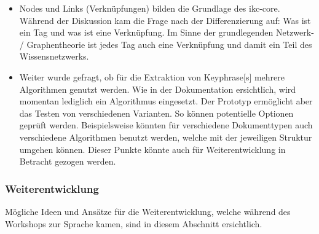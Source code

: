 \begin{itemize}
    \item Nodes und Links (Verknüpfungen) bilden die Grundlage des \gls{ikc-core}. Während der Diskussion kam die Frage nach der Differenzierung auf: Was ist ein Tag und was ist eine Verknüpfung. Im Sinne der grundlegenden Netzwerk- / Graphentheorie ist jedes Tag auch eine Verknüpfung und damit ein Teil des Wissensnetzwerks.
    \item Weiter wurde gefragt, ob für die Extraktion von \gls{Keyphrase}[s] mehrere Algorithmen genutzt werden. Wie in der Dokumentation ersichtlich, wird momentan lediglich ein Algorithmus eingesetzt. Der Prototyp ermöglicht aber das Testen von verschiedenen Varianten. So können potentielle Optionen geprüft werden. Beispielsweise könnten für verschiedene Dokumenttypen auch verschiedene Algorithmen benutzt werden, welche mit der jeweiligen Struktur umgehen können. Dieser Punkte könnte auch für Weiterentwicklung in Betracht gezogen werden.
\end{itemize}

\subsubsection{Weiterentwicklung}
Mögliche Ideen und Ansätze für die Weiterentwicklung, welche wäh\-rend des Workshops zur Sprache kamen, sind in diesem Abschnitt ersichtlich.

